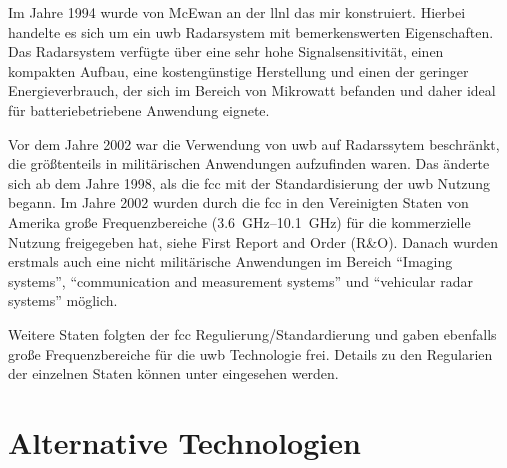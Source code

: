 

Im Jahre 1994 wurde von McEwan an der \ac{llnl} das \ac{mir} konstruiert. Hierbei handelte es sich um ein \ac{uwb} Radarsystem mit bemerkenswerten Eigenschaften. Das Radarsystem verfügte über eine sehr hohe Signalsensitivität, einen kompakten Aufbau, eine kostengünstige Herstellung und einen der geringer Energieverbrauch, der sich im Bereich von Mikrowatt befanden und daher ideal für batteriebetriebene Anwendung eignete. \cite{barrett2001technical}


Vor dem Jahre 2002 war die Verwendung von \ac{uwb} auf Radarssytem beschränkt, die größtenteils in militärischen Anwendungen aufzufinden waren. \cite{yang2004uwbcom} Das änderte sich ab dem Jahre 1998, als die \ac{fcc} mit der Standardisierung der \ac{uwb} Nutzung begann. Im Jahre 2002 wurden durch die \ac{fcc} in den Vereinigten Staten von Amerika große Frequenzbereiche (\SIrange{3.6}{10.1}{\GHz}) für die kommerzielle Nutzung freigegeben hat, siehe First Report and Order (R\&O). Danach wurden erstmals auch eine nicht militärische Anwendungen im Bereich ``Imaging systems'', ``communication and measurement systems'' und ``vehicular radar systems'' möglich. \cite{yang2004uwbcom}


Weitere Staten folgten der \ac{fcc} Regulierung/Standardierung und gaben ebenfalls große Frequenzbereiche für die \ac{uwb} Technologie frei. Details zu den Regularien der einzelnen Staten können unter \cite{decawave2015uwbreg} eingesehen werden.

	
\begin{comment}
------------------------------------------------------------------------------------------
\end{comment}
\section{Alternative Technologien}

